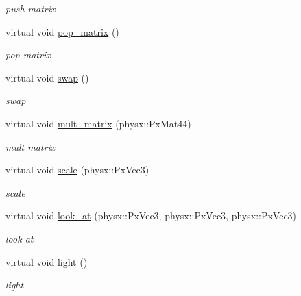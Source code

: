 \begin{DoxyCompactItemize}
\begin{DoxyCompactList}\small\item\em push matrix \item\end{DoxyCompactList}\item 
virtual void \hyperlink{classnebula_1_1platform_1_1renderer_1_1base_a973b0e5edc9ed9b90a4ab2f209794e24}{pop\_\-matrix} ()
\begin{DoxyCompactList}\small\item\em pop matrix \item\end{DoxyCompactList}\item 
virtual void \hyperlink{classnebula_1_1platform_1_1renderer_1_1base_a0c23f96aaae8c8fbe421bd0c734da6b9}{swap} ()
\begin{DoxyCompactList}\small\item\em swap \item\end{DoxyCompactList}\item 
virtual void \hyperlink{classnebula_1_1platform_1_1renderer_1_1base_a42be4fa519953220e66cebbc5d56ec31}{mult\_\-matrix} (physx::PxMat44)
\begin{DoxyCompactList}\small\item\em mult matrix \item\end{DoxyCompactList}\item 
virtual void \hyperlink{classnebula_1_1platform_1_1renderer_1_1base_a7d9aa890990667e9981af855a2c58cf7}{scale} (physx::PxVec3)
\begin{DoxyCompactList}\small\item\em scale \item\end{DoxyCompactList}\item 
virtual void \hyperlink{classnebula_1_1platform_1_1renderer_1_1base_a178cbf87e4677f7efaf44ce5de29a580}{look\_\-at} (physx::PxVec3, physx::PxVec3, physx::PxVec3)
\begin{DoxyCompactList}\small\item\em look at \item\end{DoxyCompactList}\item 
virtual void \hyperlink{classnebula_1_1platform_1_1renderer_1_1base_af5a83a10b4c0b04997997f3337b49bd6}{light} ()
\begin{DoxyCompactList}\small\item\em light \item\end{DoxyCompactList}\item 

\end{DoxyCompactItemize}
